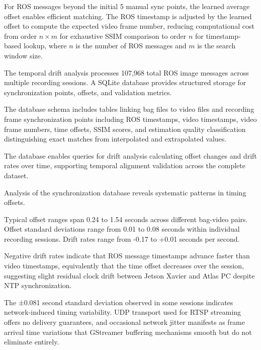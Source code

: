 \documentclass{erauthesis}
\begin{document}

For ROS messages beyond the initial 5 manual sync points, the learned average offset enables efficient matching.
The ROS timestamp is adjusted by the learned offset to compute the expected video frame number, reducing computational cost from order $n \times m$ for exhaustive SSIM comparison to order $n$ for timestamp-based lookup, where $n$ is the number of ROS messages and $m$ is the search window size.


The temporal drift analysis processes 107,968 total ROS image messages across multiple recording sessions.
A SQLite database provides structured storage for synchronization points, offsets, and validation metrics.

The database schema includes tables linking bag files to video files and recording frame synchronization points including ROS timestamps, video timestamps, video frame numbers, time offsets, SSIM scores, and estimation quality classification distinguishing exact matches from interpolated and extrapolated values.

The database enables queries for drift analysis calculating offset changes and drift rates over time, supporting temporal alignment validation across the complete dataset.


Analysis of the synchronization database reveals systematic patterns in timing offsets.


Typical offset ranges span 0.24 to 1.54 seconds across different bag-video pairs.
Offset standard deviations range from 0.01 to 0.08 seconds within individual recording sessions.
Drift rates range from -0.17 to +0.01 seconds per second.

Negative drift rates indicate that ROS message timestamps advance faster than video timestamps, equivalently that the time offset decreases over the session, suggesting slight residual clock drift between Jetson Xavier and Atlas PC despite NTP synchronization.


The ±0.081 second standard deviation observed in some sessions indicates network-induced timing variability.
UDP transport used for RTSP streaming offers no delivery guarantees, and occasional network jitter manifests as frame arrival time variations that GStreamer buffering mechanisms smooth but do not eliminate entirely.
\end{document}
